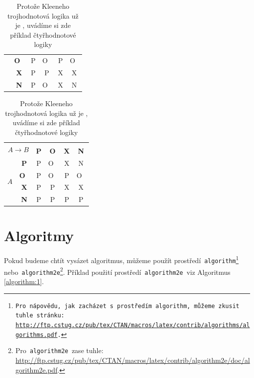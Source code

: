 \documentclass[a4paper, 11pt]{article}
\begin{document}
\begin{table}[h]
\begin{tabular}{|c|>{\bfseries}c|c|c|c|c|}
    & O~& P & O~& P & O~\\ \cline{2-6}
    & X & P & P & X & X \\ \cline{2-6}
    & N & P & O~& X & N \\ \cline{2-6}
    \hline 
\end{tabular}
\begin{tabular}{|c|>{\bfseries}c|c|c|c|c|}
    \hline 
    \multicolumn{2}{|c|}{\multirow{2}{*}{$A \rightarrow B$}}&\multicolumn{4}{|c|}{$B$}\\\cline{3-6}
    \multicolumn{2}{|c|}{} & \textbf{P} & \textbf{O} & \textbf{X} & \textbf{N} \\ 
    \hline 
    \multirow{4}{*}{$A$}
    & P & P & O~& X & N \\ \cline{2-6} 
    & O~& P & O~& P & O~\\ \cline{2-6}
    & X & P & P & X & X \\ \cline{2-6}
    & N & P & P & P & P \\ \cline{2-6}
    \hline 
\end{tabular}

\caption{Protože Kleeneho trojhodnotová logika už je , uvádíme si zde příklad čtyřhodnotové logiky}
\label{table:2}
\end{table}

\bigskip

\pagebreak

\section{Algoritmy}
\label{section:algorithm}
Pokud budeme chtít vysázet algoritmus, můžeme použít prostředí\texttt{ algorithm\footnote{Pro nápovědu, jak zacházet s~prostředím\texttt{ algorithm,} můžeme zkusit tuhle stránku:\\
\href{http://ftp.cstug.cz/pub/tex/CTAN/macros/latex/contrib/algorithms/algorithms.pdf}{http://ftp.cstug.cz/pub/tex/CTAN/macros/latex/contrib/algorithms/algorithms.pdf}.} } 
nebo\texttt{ algorithm2e}\footnote{Pro\texttt{ algorithm2e }zase tuhle:
\href{http://ftp.cstug.cz/pub/tex/CTAN/macros/latex/contrib/algorithm2e/doc/algorithm2e.pdf}{http://ftp.cstug.cz/pub/tex/CTAN/macros/latex/contrib/algorithm2e/doc/algorithm2e.pdf}.}.
Příklad použití prostředí\texttt{ algorithm2e }viz Algoritmus \ref{algorithm:1}.

\bigskip
\end{document}
